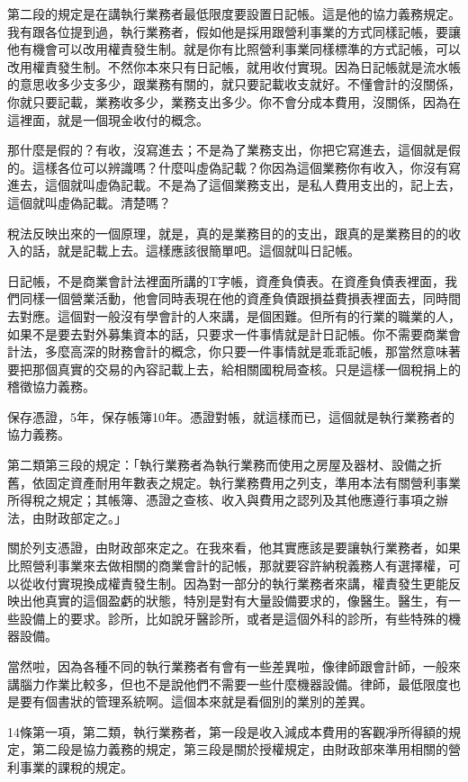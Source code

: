 \documentclass[oneside,sub3section]{ctexbook}
\begin{document}
第二段的規定是在講執行業務者最低限度要設置日記帳。這是他的協力義務規定。我有跟各位提到過，執行業務者，假如他是採用跟營利事業的方式同樣記帳，要讓他有機會可以改用權責發生制。就是你有比照營利事業同樣標準的方式記帳，可以改用權責發生制。不然你本來只有日記帳，就用收付實現。因為日記帳就是流水帳的意思收多少支多少，跟業務有關的，就只要記載收支就好。不懂會計的沒關係，你就只要記載，業務收多少，業務支出多少。你不會分成本費用，沒關係，因為在這裡面，就是一個現金收付的概念。

那什麼是假的？有收，沒寫進去；不是為了業務支出，你把它寫進去，這個就是假的。這樣各位可以辨識嗎？什麼叫虛偽記載？你因為這個業務你有收入，你沒有寫進去，這個就叫虛偽記載。不是為了這個業務支出，是私人費用支出的，記上去，這個就叫虛偽記載。清楚嗎？

稅法反映出來的一個原理，就是，真的是業務目的的支出，跟真的是業務目的的收入的話，就是記載上去。這樣應該很簡單吧。這個就叫日記帳。

日記帳，不是商業會計法裡面所講的T字帳，資產負債表。在資產負債表裡面，我們同樣一個營業活動，他會同時表現在他的資產負債跟損益費損表裡面去，同時間去對應。這個對一般沒有學會計的人來講，是個困難。但所有的行業的職業的人，如果不是要去對外募集資本的話，只要求一件事情就是計日記帳。你不需要商業會計法，多麼高深的財務會計的概念，你只要一件事情就是乖乖記帳，那當然意味著要把那個真實的交易的內容記載上去，給相關國稅局查核。只是這樣一個稅捐上的稽徵協力義務。

保存憑證，5年，保存帳簿10年。憑證對帳，就這樣而已，這個就是執行業務者的協力義務。

第二類第三段的規定：「執行業務者為執行業務而使用之房屋及器材、設備之折舊，依固定資產耐用年數表之規定。執行業務費用之列支，準用本法有關營利事業所得稅之規定；其帳簿、憑證之查核、收入與費用之認列及其他應遵行事項之辦法，由財政部定之。」

關於列支憑證，由財政部來定之。在我來看，他其實應該是要讓執行業務者，如果比照營利事業來去做相關的商業會計的記帳，那就要容許納稅義務人有選擇權，可以從收付實現換成權責發生制。因為對一部分的執行業務者來講，權責發生更能反映出他真實的這個盈虧的狀態，特別是對有大量設備要求的，像醫生。醫生，有一些設備上的要求。診所，比如說牙醫診所，或者是這個外科的診所，有些特殊的機器設備。

當然啦，因為各種不同的執行業務者有會有一些差異啦，像律師跟會計師，一般來講腦力作業比較多，但也不是說他們不需要一些什麼機器設備。律師，最低限度也是要有個書狀的管理系統啊。這個本來就是看個別的業別的差異。

14條第一項，第二類，執行業務者，第一段是收入減成本費用的客觀凈所得額的規定，第二段是協力義務的規定，第三段是關於授權規定，由財政部來準用相關的營利事業的課稅的規定。
\end{document}

